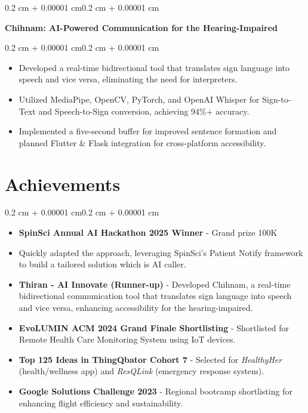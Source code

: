 \documentclass[10pt, letterpaper]{article}
\newenvironment{highlights}{
    \begin{itemize}[topsep=0.10 cm, parsep=0.10 cm, partopsep=0pt, itemsep=0pt, leftmargin=0.4 cm + 10pt]
}{
    \end{itemize}
}
\newenvironment{onecolentry}{
    \begin{adjustwidth}{0.2 cm + 0.00001 cm}{0.2 cm + 0.00001 cm}
}{
    \end{adjustwidth}
}
\newenvironment{twocolentry}[2][]{
    \onecolentry
    \def\secondColumn{#2}
    \setcolumnwidth{\fill, 4.5 cm}
    \begin{paracol}{2}
}{
    \switchcolumn \raggedleft \secondColumn
    \end{paracol}
    \endonecolentry
}
\let\hrefWithoutArrow\href
\renewcommand{\href}[2]{\hrefWithoutArrow{#1}{\ifthenelse{\equal{#2}{}}{ }{#2 }\raisebox{.15ex}{\footnotesize \faExternalLink*}}}
\begin{document}
        \vspace{0.2 cm}
        \begin{twocolentry}{
            \textit{\href{https://www.canva.com/design/DAGfjyJeS54/HrQgrsU_ZcPwcL-91XyhUQ/edit?utm_content=DAGfjyJeS54&utm_campaign=designshare&utm_medium=link2&utm_source=sharebutton}{Link}}}
            \textbf{Chihnam: AI-Powered Communication for the Hearing-Impaired}
        \end{twocolentry}
        \vspace{0.10 cm}
        \begin{onecolentry}
            \begin{highlights}
                \item Developed a real-time bidirectional tool that translates sign language into speech and vice versa, eliminating the need for interpreters.
                \item Utilized MediaPipe, OpenCV, PyTorch, and OpenAI Whisper for Sign-to-Text and Speech-to-Sign conversion, achieving 94\%+ accuracy.
                \item Implemented a five-second buffer for improved sentence formation and planned Flutter \& Flask integration for cross-platform accessibility.
            \end{highlights}
        \end{onecolentry}

    \section{Achievements}
        \begin{onecolentry}
            \begin{highlights}
                \item \textbf{SpinSci Annual AI Hackathon 2025 Winner} - Grand prize 100K
                \item Quickly adapted the approach, leveraging SpinSci’s Patient Notify framework to build a tailored solution which is AI caller.
                \item \textbf{Thiran - AI Innovate (Runner-up)} - Developed Chihnam, a real-time bidirectional communication tool that translates sign language into speech and vice versa, enhancing accessibility for the hearing-impaired.
                \item \textbf{EvoLUMIN ACM 2024 Grand Finale Shortlisting} - Shortlisted for Remote Health Care Monitoring System using IoT devices.
                \item \textbf{Top 125 Ideas in ThingQbator Cohort 7} - Selected for \textit{HealthyHer} (health/wellness app) and \textit{ResQLink} (emergency response system).
                \item \textbf{Google Solutions Challenge 2023} - Regional bootcamp shortlisting for enhancing flight efficiency and sustainability.
            \end{highlights}
        \end{onecolentry}
\end{document}
